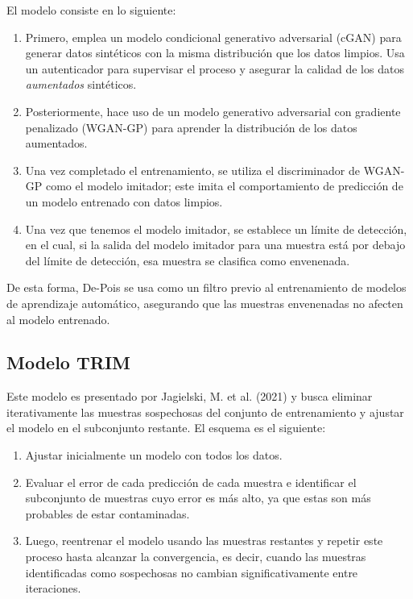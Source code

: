 \documentclass[letterpaper,12pt,oneside]{book}
\begin{document}
{{{{El modelo consiste en lo siguiente: 
\begin{enumerate}
    \item Primero, emplea un modelo condicional generativo adversarial (cGAN) para generar datos sintéticos con la misma distribución que los datos limpios. Usa un autenticador para supervisar el proceso y asegurar la calidad de los datos \textit{aumentados} sintéticos.
    \item Posteriormente, hace uso de un modelo generativo adversarial con gradiente penalizado (WGAN-GP) para aprender la distribución de los datos aumentados.
    \item Una vez completado el entrenamiento, se utiliza el discriminador de WGAN-GP como el modelo imitador; este imita el comportamiento de predicción de un modelo entrenado con datos limpios.
    \item Una vez que tenemos el modelo imitador, se establece un límite de detección, en el cual, si la salida del modelo imitador para una muestra está por debajo del límite de detección, esa muestra se clasifica como envenenada.
\end{enumerate}    

De esta forma, De-Pois se usa como un filtro previo al entrenamiento de modelos de aprendizaje automático, asegurando que las muestras envenenadas no afecten al modelo entrenado.

\subsection{Modelo TRIM}

Este modelo es presentado por Jagielski, M. et al. (2021) y busca eliminar iterativamente las muestras sospechosas del conjunto de entrenamiento y ajustar el modelo en el subconjunto restante. El esquema es el siguiente:

\begin{enumerate}
    \item Ajustar inicialmente un modelo con todos los datos.
    \item Evaluar el error de cada predicción de cada muestra e identificar el subconjunto de muestras cuyo error es más alto, ya que estas son más probables de estar contaminadas.
    \item Luego, reentrenar el modelo usando las muestras restantes y repetir este proceso hasta alcanzar la convergencia, es decir, cuando las muestras identificadas como sospechosas no cambian significativamente entre iteraciones.
\end{enumerate}

}}}}
\end{document}
